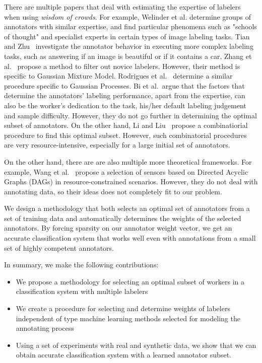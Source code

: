 \documentclass{llncs}
\begin{document}
There are multiple papers that deal with estimating the expertise of labelers when using \textit{wisdom of crowds}. For example, Welinder et al. \cite{welinder2010multidimensional} determine groups of annotators with similar expertise, and find particular phenomena such as "schools of thought" and specialist experts in certain types of image labeling tasks. Tian and Zhu~\cite{tian2012learning} investigate the annotator behavior in executing more complex labeling tasks, such as answering if an image is beautiful or if it contains a car. Zhang et al.~\cite{zhang2013learning} propose a method to filter out novice labelers. However, their method is specific to Gaussian Mixture Model. Rodrigues et al.~\cite{rodrigues2014gaussian} determine a similar procedure specific to Gaussian Processes. Bi et al.~\cite{bi2014learning}argue that the factors that determine the annotators' labeling performance, apart from the expertise, can also be the worker's dedication to the task, his/her default labeling judgement and sample difficulty. However, they do not go further in determining the optimal subset of annotators. On the other hand, Li and Liu~\cite{li_liu_2015} propose a combinatiorial procedure to find this optimal subset. However, such combinatorial procedures are very resource-intensive, especially for a large initial set of annotators.

On the other hand, there are are also multiple more theoretical frameworks. For example, Wang et al.~\cite{wang2015efficient} propose a selection of sensors based on Directed Acyclic Graphs (DAGs) in resource-constrained scenarios. However, they do not deal with annotating data, so their ideas does not completely fit to our problem. 

We design a methodology that both selects an optimal set of annotators from a set of training data and automatically determines the weights of the selected annotators. By forcing sparsity on our annotator weight vector, we get an accurate classification system that works well even with annotations from a small set of highly competent annotators.

In summary, we make the following contributions:
\begin{itemize}
\item We propose a methodology for selecting an optimal subset of workers in a classification system with multiple labelers
\item We create a procedure for selecting and determine weights of labelers independent of type machine learning methods selected for modeling the annotating process
\item Using a set of experiments with real and synthetic data, we show that we can obtain accurate classification system with a learned annotator subset.
\end{itemize}  
\end{document}
